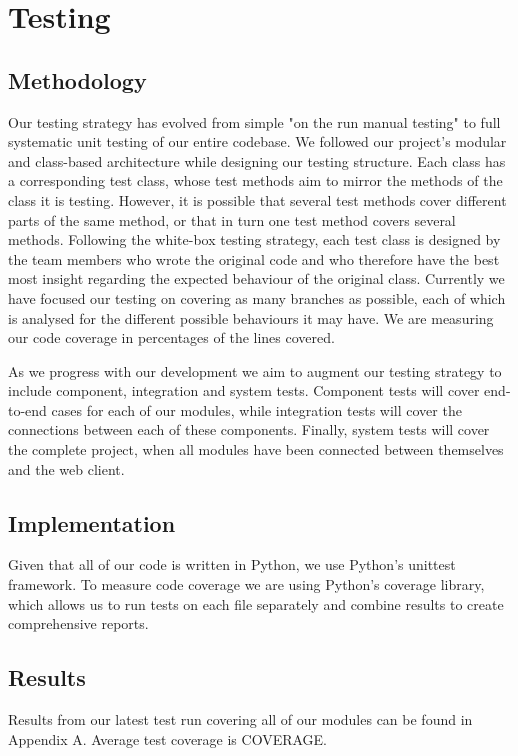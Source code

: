 \documentclass[a4paper,11pt]{article}
\begin{document}
\section{Testing}

\subsection{Methodology}
Our testing strategy has evolved from simple "on the run manual testing" to full systematic unit testing of our entire codebase. We followed our project's modular and class-based architecture while designing our testing structure. Each class has a corresponding test class, whose test methods aim to mirror the methods of the class it is testing. However, it is possible that several test methods cover different parts of the same method, or that in turn one test method covers several methods. Following the white-box testing strategy, each test class is designed by the team members who wrote the original code and who therefore have the best most insight regarding the expected behaviour of the original class. Currently we have focused our testing on covering as many branches as possible, each of which is analysed for the different possible behaviours it may have. We are measuring our code coverage in percentages of the lines covered. 

As we progress with our development we aim to augment our testing strategy to include component, integration and system tests. Component tests will cover end-to-end cases for each of our modules, while integration tests will cover the connections between each of these components. Finally, system tests will cover the complete project, when all modules have been connected between themselves and the web client.

\subsection{Implementation}
Given that all of our code is written in Python, we use Python's unittest framework. To measure code coverage we are using Python's coverage library, which allows us to run tests on each file separately and combine results to create comprehensive reports.

\subsection{Results}
Results from our latest test run covering all of our modules can be found in Appendix A. Average test coverage is COVERAGE.
\end{document}
